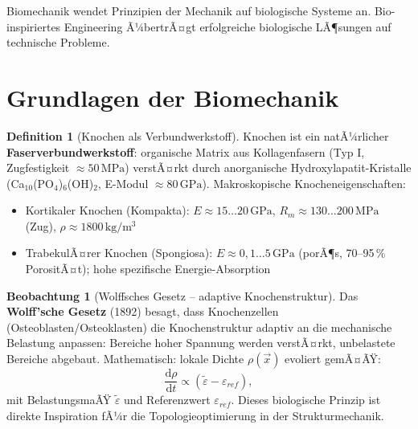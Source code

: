 ﻿\documentclass[a4paper,12pt]{report}
\theoremstyle{definition}
\newtheorem{definition}{Definition}
\newtheorem{beobachtung}{Beobachtung}
\begin{document}
Biomechanik wendet Prinzipien der Mechanik auf biologische Systeme an.
Bio-inspiriertes Engineering Ã¼bertrÃ¤gt erfolgreiche biologische LÃ¶sungen
auf technische Probleme.

\section{Grundlagen der Biomechanik}

\begin{definition}[Knochen als Verbundwerkstoff]
Knochen ist ein natÃ¼rlicher \textbf{Faserverbundwerkstoff}:
organische Matrix aus Kollagenfasern (Typ I, Zugfestigkeit $\approx 50\,\mathrm{MPa}$)
verstÃ¤rkt durch anorganische Hydroxylapatit-Kristalle
(Ca$_{10}$(PO$_4$)$_6$(OH)$_2$, E-Modul $\approx 80\,\mathrm{GPa}$).
Makroskopische Knocheneigenschaften:
\begin{itemize}
    \item[-] Kortikaler Knochen (Kompakta): $E \approx 15\ldots20\,\mathrm{GPa}$,
          $R_m \approx 130\ldots200\,\mathrm{MPa}$ (Zug), $\rho \approx 1800\,\mathrm{kg/m^3}$
    \item[-] TrabekulÃ¤rer Knochen (Spongiosa): $E \approx 0{,}1\ldots5\,\mathrm{GPa}$
          (porÃ¶s, 70--95\,\% PorositÃ¤t); hohe spezifische Energie-Absorption
\end{itemize}
\end{definition}

\begin{beobachtung}[Wolffsches Gesetz -- adaptive Knochenstruktur]
Das \textbf{Wolff'sche Gesetz} (1892) besagt, dass Knochenzellen
(Osteoblasten/Osteoklasten) die Knochenstruktur adaptiv an die
mechanische Belastung anpassen: Bereiche hoher Spannung werden verstÃ¤rkt,
unbelastete Bereiche abgebaut.
Mathematisch: lokale Dichte $\rho(\vec{x})$ evoliert gemÃ¤ÃŸ:
\[
  \frac{\mathrm{d}\rho}{\mathrm{d}t} \propto (\tilde{\varepsilon} - \varepsilon_{ref}),
\]
mit BelastungsmaÃŸ $\tilde{\varepsilon}$ und Referenzwert $\varepsilon_{ref}$.
Dieses biologische Prinzip ist direkte Inspiration fÃ¼r die
Topologieoptimierung in der Strukturmechanik.
\end{beobachtung}
\end{document}
